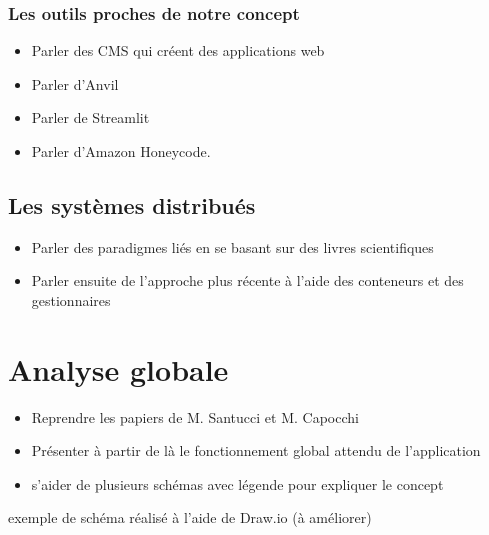 \documentclass{rapport_stage}
\begin{document}
\subsection*{Les outils proches de notre concept}

\begin{itemize}[label=$\bullet$]
  \item Parler des CMS qui créent des applications web
  \item Parler d'Anvil \cite{anvil_team_overview_nodate}
  \item Parler de Streamlit \cite{streamlit_team_streamlit_nodate}
  \item Parler d'Amazon Honeycode. \cite{honeycode_team_no-code_nodate}
\end{itemize}

\section{Les systèmes distribués}

\begin{itemize}
  \item Parler des paradigmes liés en se basant sur des livres scientifiques \cite*{tanenbaum_distributed_2007} \cite*{coulouris_distributed_2012}
  \item Parler ensuite de l'approche plus récente à l'aide des conteneurs et des gestionnaires \cite*{burns_designing_2018} \cite*{kleppmann_designing_2017}
\end{itemize}

\chapter{Analyse globale}

\begin{itemize}[label=$\bullet$]
  \item Reprendre les papiers de M. Santucci et M. Capocchi \cite*{capocchi_devs_2022} \cite*{capocchi_towards_2023}
  \item Présenter à partir de là le fonctionnement global attendu de l'application
  \item s'aider de plusieurs schémas avec légende pour expliquer le concept
\end{itemize}

{ \color{green}
exemple de schéma réalisé à l'aide de Draw.io (à améliorer)
}
\end{document}
